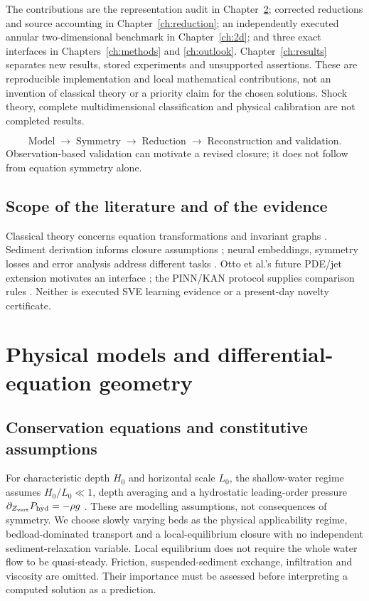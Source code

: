 \documentclass[11pt,a4paper,oneside]{report}
\numberwithin{equation}{chapter}
\begin{document}
The contributions are the representation audit in Chapter~\ref{ch:models}; corrected reductions and source accounting in Chapter~\ref{ch:reduction}; an independently executed annular two-dimensional benchmark in Chapter~\ref{ch:2d}; and three exact interfaces in Chapters~\ref{ch:methods} and \ref{ch:outlook}. Chapter~\ref{ch:results} separates new results, stored experiments and unsupported assertions. These are reproducible implementation and local mathematical contributions, not an invention of classical theory or a priority claim for the chosen solutions. Shock theory, complete multidimensional classification and physical calibration are not completed results.

\begin{equation*}
\text{Model}\;\longrightarrow\;\text{Symmetry}\;\longrightarrow\;\text{Reduction}
\;\longrightarrow\;\text{Reconstruction and validation}.
\end{equation*}
Observation-based validation can motivate a revised closure; it does not follow from equation symmetry alone.


\section{Scope of the literature and of the evidence}
Classical theory concerns equation transformations and invariant graphs
\cite{olver,oliveri2026,anderson2000}. Sediment derivation informs closure
assumptions \cite{fernandez2017}; neural embeddings, symmetry losses and
error analysis address different tasks \cite{lagaris,sympinn,mishra2023}.
Otto et al.'s future PDE/jet extension motivates an interface \cite{otto};
the PINN/KAN protocol supplies comparison rules \cite{pinnkan}.
Neither is executed SVE learning evidence or a present-day novelty certificate.

\chapter{Physical models and differential-equation geometry}\label{ch:models}
\section{Conservation equations and constitutive assumptions}
For characteristic depth $H_0$ and horizontal scale $L_0$, the shallow-water
regime assumes $H_0/L_0\ll1$, depth averaging and a hydrostatic leading-order
pressure $\partial_{Z_{\rm vert}}P_{\rm hyd}=-\rho g$ \cite{clawpack}.
These are modelling assumptions, not consequences of symmetry.
We choose slowly varying beds as the physical applicability regime,
bedload-dominated transport and a local-equilibrium closure with no independent
sediment-relaxation variable. Local equilibrium does not require the whole
water flow to be quasi-steady. Friction, suspended-sediment exchange,
infiltration and viscosity are omitted. Their importance must be assessed
before interpreting a computed solution as a prediction.
\end{document}
